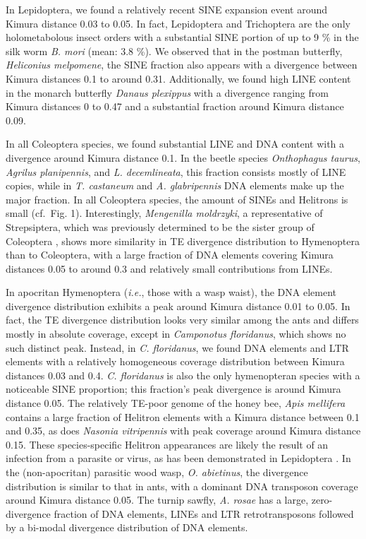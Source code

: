 In Lepidoptera, we found a relatively recent SINE expansion event around
Kimura distance 0.03 to 0.05. In fact, Lepidoptera and Trichoptera are
the only holometabolous insect orders with a substantial SINE portion of
up to 9 \% in the silk worm \emph{B. mori} (mean: 3.8 \%). We observed
that in the postman butterfly, \emph{Heliconius melpomene}, the SINE
fraction also appears with a divergence between Kimura distances 0.1 to
around 0.31. Additionally, we found high LINE content in the monarch
butterfly \emph{Danaus plexippus} with a divergence ranging from Kimura
distances 0 to 0.47 and a substantial fraction around Kimura distance
0.09.

In all Coleoptera species, we found substantial LINE and DNA content
with a divergence around Kimura distance 0.1. In the beetle species
\emph{Onthophagus taurus}, \emph{Agrilus planipennis}, and \emph{L.
decemlineata}, this fraction consists mostly of LINE copies, while in
\emph{T. castaneum} and \emph{A. glabripennis} DNA elements make up the
major fraction. In all Coleoptera species, the amount of SINEs and
Helitrons is small (cf.~Fig. 1). Interestingly, \emph{Mengenilla
moldrzyki}, a representative of Strepsiptera, which was previously
determined to be the sister group of Coleoptera \citep{Niehuis2012},
shows more similarity in TE divergence distribution to Hymenoptera than
to Coleoptera, with a large fraction of DNA elements covering Kimura
distances 0.05 to around 0.3 and relatively small contributions from
LINEs.

In apocritan Hymenoptera (\emph{i.e.}, those with a wasp waist), the DNA
element divergence distribution exhibits a peak around Kimura distance
0.01 to 0.05. In fact, the TE divergence distribution looks very similar
among the ants and differs mostly in absolute coverage, except in
\emph{Camponotus floridanus}, which shows no such distinct peak.
Instead, in \emph{C. floridanus}, we found DNA elements and LTR elements
with a relatively homogeneous coverage distribution between Kimura
distances 0.03 and 0.4. \emph{C. floridanus} is also the only
hymenopteran species with a noticeable SINE proportion; this fraction's
peak divergence is around Kimura distance 0.05. The relatively TE-poor
genome of the honey bee, \emph{Apis mellifera} contains a large fraction
of Helitron elements with a Kimura distance between 0.1 and 0.35, as
does \emph{Nasonia vitripennis} with peak coverage around Kimura
distance 0.15. These species-specific Helitron appearances are likely
the result of an infection from a parasite or virus, as has been
demonstrated in Lepidoptera \citep{Coates2015}. In the (non-apocritan)
parasitic wood wasp, \emph{O. abietinus}, the divergence distribution is
similar to that in ants, with a dominant DNA transposon coverage around
Kimura distance 0.05. The turnip sawfly, \emph{A. rosae} has a large,
zero-divergence fraction of DNA elements, LINEs and LTR retrotransposons
followed by a bi-modal divergence distribution of DNA elements.

